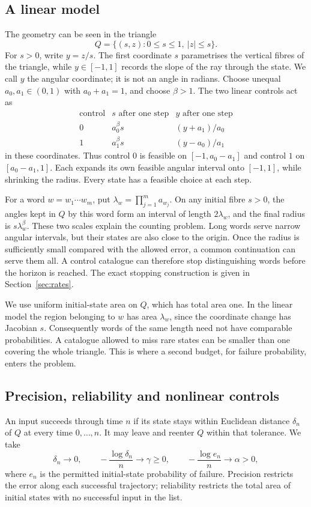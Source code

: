 \documentclass[11pt]{amsart}
\theoremstyle{definition}
\theoremstyle{remark}
\numberwithin{equation}{section}
\begin{document}
\subsection{A linear model}
The geometry can be seen in the triangle
\[
Q=\{(s,z):0\le s\le1,\ |z|\le s\}.
\]
For $s>0$, write $y=z/s$. The first coordinate $s$ parametrises the vertical fibres of the
triangle, while $y\in[-1,1]$ records the slope of the ray through
the state. We call $y$ the angular coordinate; it is
not an angle in radians. Choose unequal $a_0,a_1\in(0,1)$ with
$a_0+a_1=1$, and choose $\beta>1$. The two linear controls act as
\[
\begin{array}{c|c|c}
\text{control}&s\text{ after one step}&y\text{ after one step}\\ \hline
0&a_0^\beta s&(y+a_1)/a_0\\
1&a_1^\beta s&(y-a_0)/a_1
\end{array}
\]
in these coordinates. Thus control $0$ is feasible on
$[-1,a_0-a_1]$ and control $1$ on $[a_0-a_1,1]$. Each expands
its own feasible angular interval onto $[-1,1]$, while shrinking
the radius. Every state has a feasible choice at each step.

For a word $w=w_1\cdots w_m$, put
$\lambda_w=\prod_{j=1}^m a_{w_j}$. On any initial fibre $s>0$,
the angles kept in $Q$ by this word form an interval of length
$2\lambda_w$, and the final radius is $s\lambda_w^\beta$.
These two scales explain the counting problem. Long words serve
narrow angular intervals, but their states are also close to the
origin. Once the radius is sufficiently small compared with the
allowed error, a common continuation can serve them all. A control
catalogue can therefore stop distinguishing words before the
horizon is reached. The exact stopping construction is given in
Section~\ref{sec:rates}.

We use uniform initial-state area on $Q$, which has total area one.
In the linear model the region belonging to $w$ has area
$\lambda_w$, since the coordinate change has Jacobian $s$.
Consequently words of the same length need not have comparable
probabilities. A catalogue allowed to miss rare states can be
smaller than one covering the whole triangle. This is where a
second budget, for failure probability, enters the problem.

\subsection{Precision, reliability and nonlinear controls}
An input succeeds through time $n$ if its state stays within
Euclidean distance $\delta_n$ of $Q$ at every time $0,\ldots,n$.
It may leave and reenter $Q$ within that tolerance. We take
\[
\delta_n\to0,\qquad -\frac{\log\delta_n}{n}\to\gamma\ge0,
\qquad -\frac{\log e_n}{n}\to\alpha>0,
\]
where $e_n$ is the permitted initial-state probability of failure.
Precision restricts the error along each successful trajectory;
reliability restricts the total area of initial states with no
successful input in the list.
\end{document}
